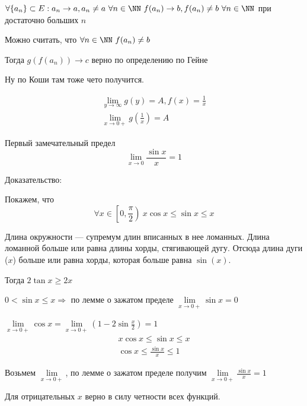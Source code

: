 \(
    \forall \{ a_n \} \subset E : a_n \to a, a_n \neq a \ \forall n \in \NN \ f(a_n) \to b, f(a_n) \neq b \ \forall n \in \NN
\)
при достаточно больших \( n \)

Можно считать, что \( \forall n \in \NN \ f(a_n) \neq b \)

Тогда \( g(f(a_n)) \to c \) верно по определению по Гейне

Ну по Коши там тоже чето получится.

\begin{example}{}{}
    \begin{gather*}
        \lim\limits_{y \to \infty} g(y) = A, f(x) = \frac{1}{x}
        \\
        \lim\limits_{x \to 0+} g \left( \frac{1}{x} \right) = A
    \end{gather*}
\end{example}


\begin{thrm}{Первый замечательный предел}{}
    \[
        \lim\limits_{x \to 0} \frac{\sin x}{x} = 1
    \]
\end{thrm}

Доказательство:

Покажем, что
\[
    \forall x \in \left[ 0, \frac{\pi}{2} \right) \ x \cos x \leq \sin x \leq x
\]

Длина окружности --- супремум длин вписанных в нее ломанных.
Длина ломанной больше или равна длины хорды, стягивающей дугу.
Отсюда длина дуги (\( x \)) больше или равна хорды, которая больше равна \( \sin(x) \).


Тогда \( 2 \tan x \geq 2x \)

\( 0 < \sin x \leq x \Rightarrow \) по лемме о зажатом пределе \( \lim\limits_{x \to 0+} \sin x = 0 \)

\( \lim\limits_{x \to 0+} \cos x = \lim\limits_{x \to 0+} (1 - 2 \sin \frac{x}{2}) = 1 \) 
\begin{gather*}
    x \cos x \leq \sin x \leq x
    \\
    \cos x \leq \frac{\sin x}{x} \leq 1
\end{gather*}

Возьмем \( \lim\limits_{x \to 0+} \), по лемме о зажатом пределе получим 
\( \lim\limits_{x \to 0+} \frac{\sin x}{x} = 1 \)

Для отрицательных \( x \) верно в силу четности всех функций.

